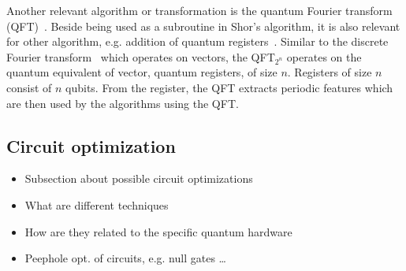 Another relevant algorithm or transformation is the quantum Fourier transform (QFT)~\cite{Copp02}. Beside being used as a subroutine in Shor's algorithm, it is also relevant for other algorithm, e.g. addition of quantum registers~\cite{Drap00}. Similar to the discrete Fourier transform~\cite{Wino78} which operates on vectors, the QFT$_{2^n}$ operates on the quantum equivalent of vector, quantum registers, of size $n$. Registers of size $n$ consist of $n$ qubits. From the register, the QFT extracts periodic features which are then used by the algorithms using the QFT.

\subsection{Circuit optimization}
\label{sec:background_algorithms}
\begin{itemize}
    \item Subsection about possible circuit optimizations
    \item What are different techniques
    \item How are they related to the specific quantum hardware
    \item Peephole opt. of circuits, e.g. null gates \dots
\end{itemize}